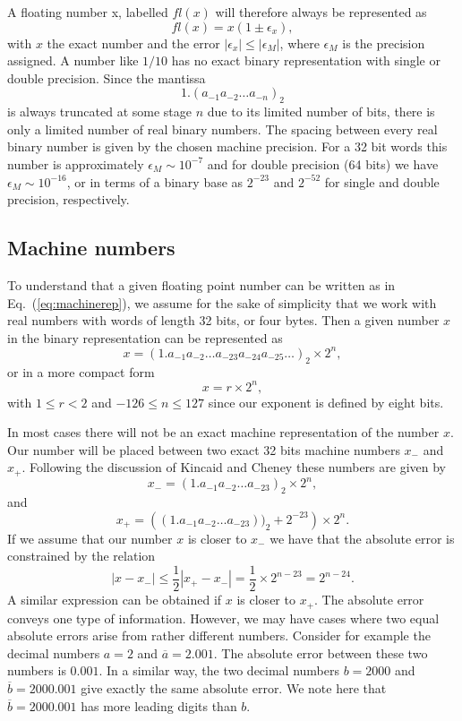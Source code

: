 A floating number x, labelled $fl(x)$ will therefore always be represented as
\begin{equation}\label{eq:machinerep}
  fl(x) = x(1\pm \epsilon_x),
\end{equation}
with $x$ the exact number and the error $|\epsilon_x| \le |\epsilon_M|$, where
$\epsilon_M$ is the precision assigned. A number like $1/10$ has no exact binary representation
with single or double precision. Since the mantissa 
\[
1.\left(a_{-1}a_{-2}\dots a_{-n}\right)_2
\]
is always truncated at some stage $n$ due to its limited number of bits, there is only a 
limited number of real binary numbers. The spacing between every real binary number is given by the 
chosen machine precision.
For a 32 bit words this number is approximately
$ \epsilon_M \sim 10^{-7}$ and for double precision (64 bits) we have
$ \epsilon_M \sim 10^{-16}$, or in terms of a binary base
as $2^{-23}$ and $2^{-52}$ for single and double precision, respectively.  


\subsection{Machine numbers}
To understand that a given floating point number can be written as in Eq.~(\ref{eq:machinerep}),
we assume for the sake of simplicity that we work with 
real numbers with words of length 32 bits, or four bytes.
Then a given number $x$ in the binary representation can be represented as
\[
x= (1.a_{-1}a_{-2}\dots a_{-23}a_{-24}a_{-25}\dots)_2\times 2^n,
\]
or in a more compact form
\[
  x = r\times 2^n,
\]
with $ 1\le r < 2$ and $-126 \le n \le 127$ since our exponent is defined by eight bits.

In most cases there will not be an exact machine representation of the number $x$.  Our number will
be placed between two exact 32 bits machine numbers $x_{-}$ and $x_{+}$. Following the discussion of
Kincaid and Cheney \cite{kincaid} these numbers are given by
\[
x_{-}= (1.a_{-1}a_{-2}\dots a_{-23})_2\times 2^n,
\]
and
\[
x_{+}= \left((1.a_{-1}a_{-2}\dots a_{-23}))_2+2^{-23}\right)\times 2^n.
\]
If we assume that our number $x$ is closer to $x_{-}$  we have  that the absolute error is 
constrained by the relation
\[
   |x-x_{-}| \le \frac{1}{2}|x_{+}-x_{-}|=\frac{1}{2}\times 2^{n-23}=2^{n-24}. 
\]
A similar expression can be obtained if $x$ is closer to $x_{+}$.  
The absolute error conveys one type of information. However, we may have cases where two equal
absolute errors arise from rather different numbers. Consider for example the decimal
numbers $a=2$ and $\overline{a}=2.001$. The absolute error between these two numbers is $0.001$.
In a similar way, the two decimal numbers $b=2000$ and $\overline{b}=2000.001$ give exactly
the same absolute error. We note here that $\overline{b}=2000.001$ has more leading digits than
$b$.


